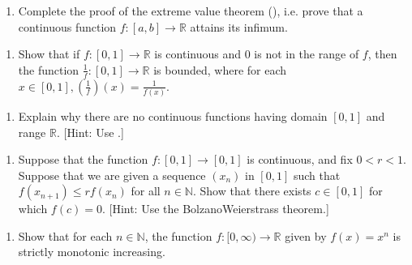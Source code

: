 \documentclass[letterpaper,10pt,english]{jupyterBook}
\begin{document}
\label{\detokenize{Problems:id27}}\begin{enumerate}
%
\setcounter{enumi}{26}
\item {} 
\sphinxAtStartPar
Complete the proof of the extreme value theorem (), i.e. prove that a continuous function \(f:[a,b]\to\mathbb{R}\) attains its infimum.

\end{enumerate}
\label{\detokenize{Problems:id28}}\begin{enumerate}
%
\setcounter{enumi}{27}
\item {} 
\sphinxAtStartPar
Show that if \(f:[0,1] \rightarrow \mathbb{R}\) is continuous and \(0\) is not in the range of  \(f\), then the function \(\frac{1}{f}:[0,1]\to \mathbb{R}\) is bounded, where for each \(x \in [0,1], \left(\frac{1}{f}\right)(x) = \frac{1}{f(x)}\).

\end{enumerate}
\label{\detokenize{Problems:id29}}\begin{enumerate}
%
\setcounter{enumi}{28}
\item {} 
\sphinxAtStartPar
Explain why there are no continuous functions having domain \([0, 1]\) and range \(\mathbb{R}\). {[}Hint: Use .{]}

\end{enumerate}
\label{\detokenize{Problems:id30}}\begin{enumerate}
%
\setcounter{enumi}{29}
\item {} 
\sphinxAtStartPar
Suppose that the function \(f:[0,1] \rightarrow [0,1]\) is continuous, and fix \(0 < r < 1\). Suppose that we are given a sequence \((x_{n})\) in \([0,1]\) such that \(f(x_{n+1}) \leq rf(x_{n})\) for all \(n\in\mathbb{N}\). Show that there exists \(c \in [0, 1]\) for which \(f(c) = 0\). {[}Hint: Use the Bolzano\sphinxhyphen{}Weierstrass theorem.{]}

\end{enumerate}
\label{\detokenize{Problems:id31}}\begin{enumerate}
%
\setcounter{enumi}{30}
\item {} 
\sphinxAtStartPar
Show that for each \(n\in\mathbb{N}\), the function \(f: [0, \infty)\to\mathbb{R}\) given by \(f(x) =x^{n}\) is strictly monotonic increasing.

\end{enumerate}
\end{document}
